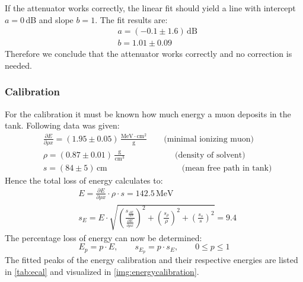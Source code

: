 If the attenuator works correctly, the linear fit should yield a line with intercept $a=0$\,dB and slope $b=1$. The fit results are:
\begin{equation}
    \begin{split}
        & a = (-0.1 \pm 1.6)\,\text{dB} \\
        & b = 1.01  \pm 0.09 
    \end{split}
\end{equation}
Therefore we conclude that the attenuator works correctly and no correction is needed.

\subsubsection{Calibration}
For the calibration it must be known how much energy a muon deposits in the tank. Following data was given:
\begin{equation}
    \begin{split}
        & \frac{\partial E}{\partial \rho x} = (1.95 \pm 0.05)\,\frac{\text{MeV}\cdot\text{cm}^2}{\text{g}} \qquad \text{(minimal ionizing muon)}  \\
        & \rho = (0.87 \pm 0.01) \, \frac{\text{g}}{\text{cm}^3}  \qquad \qquad \qquad \text{(density of solvent)} \\
        & s = (84 \pm 5) \, \text{cm} \qquad \qquad \qquad \qquad \quad  \text{(mean free path in tank)}
    \end{split}
\end{equation}
Hence the total loss of energy calculates to:
\begin{equation}
    \begin{split}
        & E = \frac{\partial E}{\partial \rho x} \cdot \rho \cdot s = 142.5\,\text{MeV} \\
        & s_{E} = E \cdot \sqrt{ \left( \frac{s_{\frac{\partial E}{\partial \rho x}}}{\frac{\partial E}{\partial \rho x}} \right)^2 + \left( \frac{s_\rho}{\rho} \right)^2 + \left( \frac{s_s}{s} \right)^2  }
        = 9.4
    \end{split}
\end{equation}
The percentage loss of energy can now be determined:
\begin{equation}
    E_p = p \cdot E, \qquad s_{E_p} = p \cdot s_E, \qquad 0 \leq p \leq 1  %
\end{equation}
The fitted peaks of the energy calibration and their respective energies are listed in \autoref{tab:ecal} and visualized in \autoref{img:energycalibration}.
